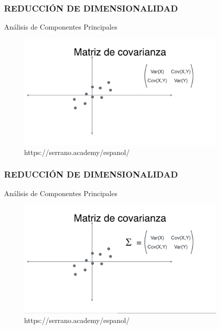 \documentclass{beamer}
\begin{document}
\begin{frame}
\frametitle{REDUCCIÓN DE DIMENSIONALIDAD}
\begin{block}{Análisis de Componentes Principales}	
	\begin{figure}
		\includegraphics[width=0.9\textwidth]{PCA/IMG_3566.jpg}
		\caption{https://serrano.academy/espanol/}
	\end{figure}
\end{block}
\end{frame}

\begin{frame}
\frametitle{REDUCCIÓN DE DIMENSIONALIDAD}
\begin{block}{Análisis de Componentes Principales}	
	\begin{figure}
		\includegraphics[width=0.9\textwidth]{PCA/IMG_3567.jpg}
		\caption{https://serrano.academy/espanol/}
	\end{figure}
\end{block}
\end{frame}
\end{document}
